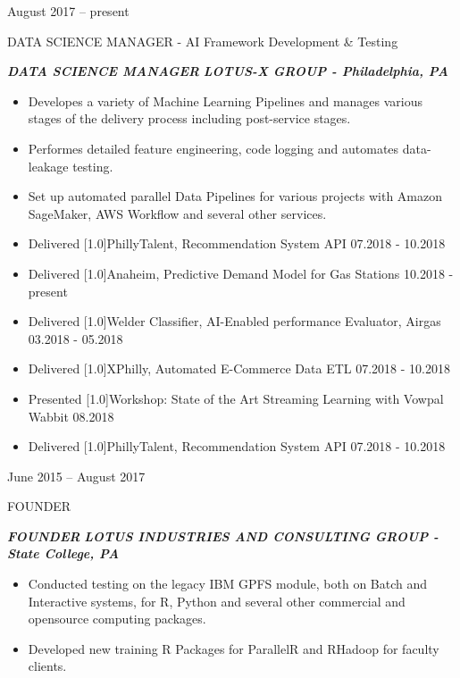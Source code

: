 \documentclass[a4paper,10pt]{article}
\newlength{\cvcolumngapwidth}
\newlength{\cvleftcolumnwidth}
\newlength{\cvrightcolumnwidth}
\newcommand{\cvtitlestyle}[1]{{\large\cvtitlefont\textcolor{cvtitlecolor}{#1}}}
\newcommand{\cvdurationstyle}[1]{{\small\cvdurationfont\textcolor{cvdurationcolor}{#1}}}
\newcommand{\cvboldstlye}[1]{{\normalsize\cvboldfont\textcolor{cvboldcolor}{\scalebox{.93}[1.0]{#1}}}}
\newlength{\cvafteritemskipamount}
\newlength{\cvaftertitleskipamount}
\newlength{\cvparskip}
\newcommand{\cvitem}[2]{
    \begin{minipage}[t]{\cvleftcolumnwidth}
        \raggedleft #1
    \end{minipage}%
    \hspace{\cvcolumngapwidth}%
    \begin{minipage}[t]{\cvrightcolumnwidth}
        \setlength{\parskip}{\cvparskip} #2
    \end{minipage}

    \vspace{\cvafteritemskipamount}
}
\newcommand{\cvtitle}[1]{
    \cvtitlestyle{#1}

    \vspace{\cvaftertitleskipamount}
    \vspace{-\cvparskip}
}
\begin{document}
\cvitem{
    \cvdurationstyle{August 2017 -- present}
}{
    \cvtitle{DATA SCIENCE MANAGER - AI Framework Development \& Testing}

    \textcolor{cvwhatcolor}{\emph{\textbf{DATA SCIENCE MANAGER}}}
    \textcolor{cvwherecolor}{\textbf{\textbar}}
    \textcolor{cvwherecolor}{\emph{\textbf{LOTUS-X GROUP - Philadelphia, PA}}}

    \begin{itemize}[leftmargin=*]
        \item Developes a variety of Machine Learning Pipelines and manages various stages of the delivery process including post-service stages.
        \item Performes detailed feature engineering, code logging and automates data-leakage testing.
        \item Set up automated parallel Data Pipelines for various projects with Amazon SageMaker, AWS Workﬂow and several other services.
        \item Delivered {\cvboldstlye{PhillyTalent, Recommendation System API} 07.2018 - 10.2018}
        \item Delivered {\cvboldstlye{Anaheim, Predictive Demand Model for Gas Stations} 10.2018 - present}
        \item Delivered {\cvboldstlye{Welder Classiﬁer, AI-Enabled performance Evaluator, Airgas} 03.2018 - 05.2018}
        \item Delivered {\cvboldstlye{XPhilly, Automated E-Commerce Data ETL} 07.2018 - 10.2018}
        \item Presented {\cvboldstlye{Workshop: State of the Art Streaming Learning with Vowpal Wabbit} 08.2018}
        \item Delivered {\cvboldstlye{PhillyTalent, Recommendation System API} 07.2018 - 10.2018}

    \end{itemize}
}


\cvitem{
    \cvdurationstyle{June 2015 -- August 2017}
}{
    \cvtitle{FOUNDER}

   \textcolor{cvwhatcolor}{\emph{\textbf{{FOUNDER}}}}
    \textcolor{cvwherecolor}{\textbf{\textbar}}
    \textcolor{cvwherecolor}{\emph{\textbf{LOTUS INDUSTRIES AND CONSULTING GROUP - State College, PA}}}

\begin{itemize}[leftmargin=*]
       \item Conducted testing on the legacy IBM GPFS module, both on Batch and Interactive systems, for R, Python and several other commercial and opensource computing packages.
       \item Developed new training R Packages for ParallelR and RHadoop for faculty clients.
  
   \end{itemize}



}
\end{document}
